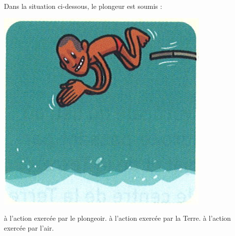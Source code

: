 \begin{questions}
\begin{multicols}{2}
	\end{multicols}

	\question[1] Dans la situation ci-dessous, le plongeur est soumis :
	
	\begin{multicols}{2}
		
		
		\begin{center}
			\includegraphics[scale=0.3]{plong}
		\end{center}
		\begin{checkboxes}
			\choice à l'action exercée par le plongeoir.
			\correctchoice à l'action exercée par la Terre.
			\correctchoice à l'action exercée par l'air.
		\end{checkboxes}
	\end{multicols}

\end{questions}